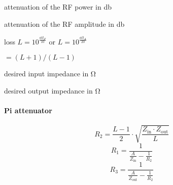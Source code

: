 \documentclass[varwidth,convert={density=300,size=800x800,outext=.png}]{standalone}
\newcommand{\Zin}{Z_\mathrm{in}}
\newcommand{\Zout}{Z_\mathrm{out}}
\begin{document}
\begin{description}[labelindent=0pt,labelsep=10pt]
\item[$att_P$] attenuation of the RF power in \si{\decibel}
\item[$att_A$] attenuation of the RF amplitude in \si{\decibel}
\item[$L$] loss $L = 10^{\frac{att_P}{10}}$ or $L = 10^{\frac{att_A}{20}}$ 
\item[$A$] $= (L+1)/(L-1)$
\item[$\Zin$] desired input impedance in \si{\ohm}
\item[$\Zout$] desired output impedance in \si{\ohm}
\end{description}

\paragraph{Pi attenuator}
\[R_2 = \frac{L - 1}{2} \cdot \sqrt{\frac{\Zin \cdot \Zout}{L}} \]
\[R_1 = \frac{1}{ \frac{A}{\Zin} -  \frac{1}{R_2}}\]
\[R_3 = \frac{1}{ \frac{A}{\Zout} -  \frac{1}{R_2}}\]

\end{document}
